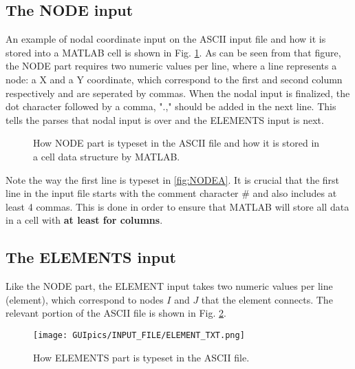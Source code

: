 \subsection{The NODE input}

An example of nodal coordinate input on the ASCII input file and how it is 
stored into a MATLAB cell is shown in Fig. \ref{fig:NODE}. As can be seen from 
that figure, the NODE part requires two numeric values per line, where a line 
represents a node: a X and a Y coordinate, which correspond to the first and 
second column respectively and are seperated by commas. When the nodal input is 
finalized, the dot character followed by a comma, ".," should be added in the 
next line. This tells the parses that nodal input is over and the ELEMENTS 
input is next.


\begin{figure}
	\centering
	 
		
	\caption{How NODE part is typeset in the ASCII file and how it is stored in 
	a cell data structure by MATLAB.}
	\label{fig:NODE}
\end{figure}

Note the way the first line is typeset in \ref{fig:NODEA}. It is crucial  that 
the first line in the input file starts with the comment character $\#$ and 
also includes at least 4 commas. This is done in order to ensure that MATLAB 
will store all data in a cell with \textbf{at least for columns}.

\subsection{The ELEMENTS input}
Like the NODE part, the ELEMENT input takes two numeric values per line 
(element), which correspond to nodes $I$ and $J$ that the element connects. The 
relevant portion of the ASCII file is shown in Fig. \ref{fig:ELEMENTS}.

\begin{figure}
	\centering
	\texttt{[image: GUIpics/INPUT\_FILE/ELEMENT\_TXT.png]}
	\caption{How ELEMENTS part is typeset in the ASCII file.}
	\label{fig:ELEMENTS}
\end{figure}

